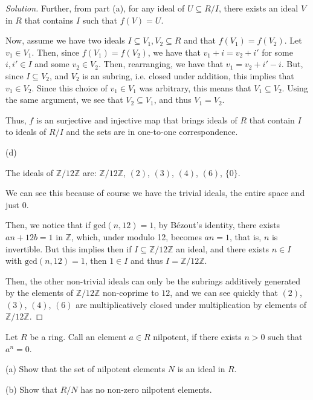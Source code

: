 \documentclass[10pt]{article}
\newenvironment{problem}[2][Problem]{\begin{trivlist}
\item[\hskip \labelsep {\bfseries #1}\hskip \labelsep {\bfseries #2.}]}{\end{trivlist}}
\begin{document}
\begin{proof}[Solution]
Further, from part (a), for any ideal of $U \subseteq R/I$, there exists an ideal $V$ in $R$ that contains $I$ such that $f (V) = U$.

Now, assume we have two ideals $I \subseteq V_1, V_2 \subseteq R$ and that $f(V_1) = f(V_2)$. Let $v_1 \in V_1$. Then, since $f(V_1) = f(V_2)$, we have that $v_1 + i = v_2 + i'$ for some $i,i' \in I$ and some $v_2 \in V_2$. Then, rearranging, we have that $v_1 = v_2 +i' - i$. But, since $I \subseteq V_2$, and $V_2$ is an subring, i.e. closed under addition, this implies that $v_1 \in V_2$. Since this choice of $v_1 \in V_1$ was arbitrary, this means that $V_1 \subseteq V_2$. Using the same argument, we see that $V_2 \subseteq V_1$, and thus $V_1 = V_2$.

Thus, $f$ is an surjective and injective map that brings ideals of $R$ that contain $I$ to ideals of $R/ I$ and the sets are in one-to-one correspondence.

(d)

The ideals of $\mathbb{Z}/12\mathbb{Z}$ are: $\mathbb{Z}/12\mathbb{Z}$, $(2)$, $(3)$, $(4)$, $(6)$, $\{ 0 \}$.

We can see this because of course we have the trivial ideals, the entire space and just $0$.

Then, we notice that if $\text{gcd}(n,12) = 1$, by B\'ezout's identity, there exists $an + 12b = 1$ in $\mathbb{Z}$, which, under modulo 12, becomes $an = 1$, that is, $n$ is invertible. But this implies then if $I \subseteq \mathbb{Z}/12\mathbb{Z}$ an ideal, and there exists $n\in I$ with $\text{gcd}(n,12) = 1$, then $1 \in I$ and thus $I = \mathbb{Z}/12\mathbb{Z}$.

Then, the other non-trivial ideals can only be the subrings additively generated by the elements of $\mathbb{Z}/12\mathbb{Z}$ non-coprime to $12$, and we can see quickly that $(2)$, $(3)$, $(4)$, $(6)$ are multiplicatively closed under multiplication by elements of $\mathbb{Z}/12\mathbb{Z}$.

\end{proof}

\begin{problem}{1.2}
Let $R$ be a ring. Call an element $a \in R$ nilpotent, if there exists $n > 0$ such that $a^n = 0$.

(a) Show that the set of nilpotent elements $N$ is an ideal in $R$.

(b) Show that $R/N$ has no non-zero nilpotent elements.

\end{problem}
\end{document}

